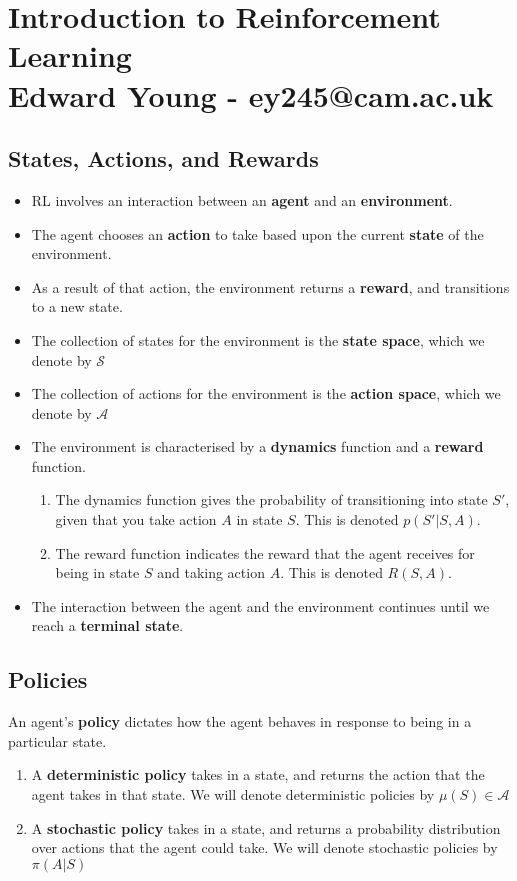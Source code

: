 \documentclass[]{article}
\title{}
\author{Edward Young \\ \large ey245@cam.ac.uk}
\date{}
\begin{document}
\section*{Introduction to Reinforcement Learning \\ \small Edward Young - ey245@cam.ac.uk}


\subsection*{States, Actions, and Rewards}
\begin{itemize}
	\item RL involves an interaction between an \textbf{agent} and an \textbf{environment}.  
	\item The agent chooses an \textbf{action} to take based upon the current \textbf{state} of the environment. 
	\item As a result of that action, the environment returns a \textbf{reward}, and transitions to a new state.
	\item The collection of states for the environment is the \textbf{state space}, which we denote by $\mathcal{S}$ 
	\item The collection of actions for the environment is the \textbf{action space}, which we denote by $\mathcal{A}$ 
	\item The environment is characterised by a \textbf{dynamics} function and a \textbf{reward} function. 
	\begin{enumerate}
		\item The dynamics function gives the probability of transitioning into state $S'$, given that you take action $A$ in state $S$. This is denoted $p(S'|S,A)$.
		\item The reward function indicates the reward that the agent receives for being in state $S$ and taking action $A$. This is denoted $R(S,A)$. 
	\end{enumerate}
	\item The interaction between the agent and the environment continues until we reach a \textbf{terminal state}. 
\end{itemize}

\subsection*{Policies}

An agent's \textbf{policy} dictates how the agent behaves in response to being in a particular state. 
\begin{enumerate}
	\item A \textbf{deterministic policy} takes in a state, and returns the action that the agent takes in that state. We will denote deterministic policies by $\mu(S) \in \mathcal{A}$ 
	\item A \textbf{stochastic policy} takes in a state, and returns a probability distribution over actions that the agent could take. We will denote stochastic policies by $\pi(A|S)$
\end{enumerate}
\end{document}
